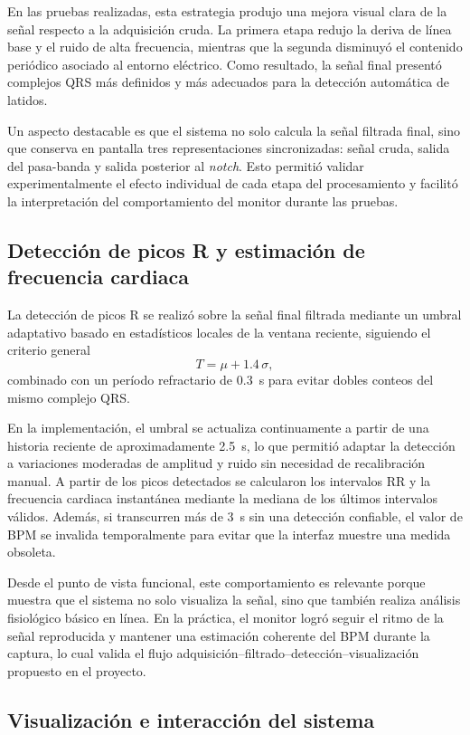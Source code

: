 En las pruebas realizadas, esta estrategia produjo una mejora visual clara de la
señal respecto a la adquisición cruda. La primera etapa redujo la deriva de línea
base y el ruido de alta frecuencia, mientras que la segunda disminuyó el contenido
periódico asociado al entorno eléctrico. Como resultado, la señal final presentó
complejos QRS más definidos y más adecuados para la detección automática de
latidos.

Un aspecto destacable es que el sistema no solo calcula la señal filtrada final,
sino que conserva en pantalla tres representaciones sincronizadas: señal cruda,
salida del pasa-banda y salida posterior al \textit{notch}. Esto permitió validar
experimentalmente el efecto individual de cada etapa del procesamiento y facilitó
la interpretación del comportamiento del monitor durante las pruebas.

\subsection{Detección de picos R y estimación de frecuencia cardiaca}

La detección de picos R se realizó sobre la señal final filtrada mediante un
umbral adaptativo basado en estadísticos locales de la ventana reciente,
siguiendo el criterio general
\[
T = \mu + 1.4\,\sigma,
\]
combinado con un período refractario de $0.3$~s para evitar dobles conteos del
mismo complejo QRS.

En la implementación, el umbral se actualiza continuamente a partir de una
historia reciente de aproximadamente 2.5~s, lo que permitió adaptar la detección
a variaciones moderadas de amplitud y ruido sin necesidad de recalibración
manual. A partir de los picos detectados se calcularon los intervalos RR y la
frecuencia cardiaca instantánea mediante la mediana de los últimos intervalos
válidos. Además, si transcurren más de 3~s sin una detección confiable, el valor
de BPM se invalida temporalmente para evitar que la interfaz muestre una medida
obsoleta.

Desde el punto de vista funcional, este comportamiento es relevante porque muestra
que el sistema no solo visualiza la señal, sino que también realiza análisis
fisiológico básico en línea. En la práctica, el monitor logró seguir el ritmo de
la señal reproducida y mantener una estimación coherente del BPM durante la
captura, lo cual valida el flujo adquisición--filtrado--detección--visualización
propuesto en el proyecto.

\subsection{Visualización e interacción del sistema}

